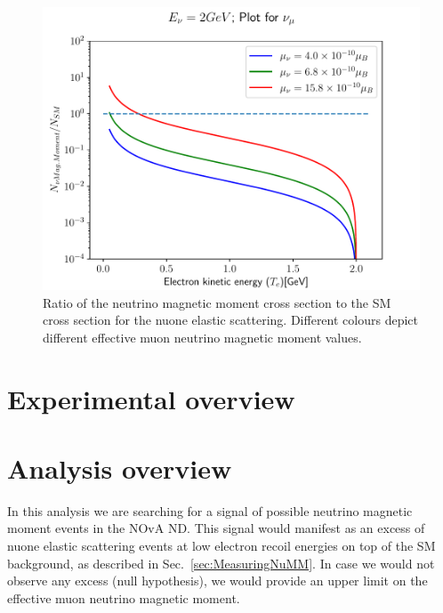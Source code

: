 \begin{figure}[hbtp]
\centering
\includegraphics[width=.9\textwidth]{Plots/NuMM/RatioNumuMMCompLinX.pdf}
\caption[Ratio of the neutrino magnetic moment and Standard Model cross sections]{Ratio of the neutrino magnetic moment cross section to the \acrshort{SM} cross section for the \acrshort{nuone} elastic scattering. Different colours depict different effective muon neutrino magnetic moment values.}
\label{fig:NuMMCrossSectionRatios}
\end{figure}


\section{Experimental overview}
\section{Analysis overview}
In this analysis we are searching for a signal of possible neutrino magnetic moment events in the \gls{NOvA} \gls{ND}. This signal would manifest as an excess of \gls{nuone} elastic scattering events at low electron recoil energies on top of the \gls{SM} background, as described in Sec.~\ref{sec:MeasuringNuMM}. In case we would not observe any excess (null hypothesis), we would provide an upper limit on the effective muon neutrino magnetic moment.

